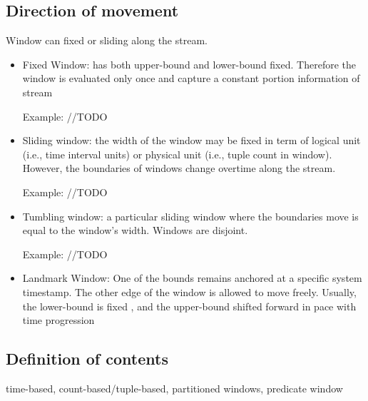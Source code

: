 \subsection{Direction of movement}
Window can fixed or sliding along the stream.
\begin{itemize}

\item Fixed Window:  has both upper-bound and lower-bound fixed. Therefore the window is evaluated only once and capture a constant portion information of stream

Example: //TODO

\item Sliding window: the width of the window may be fixed in term of logical unit (i.e., time interval units) or physical unit (i.e., tuple count in window). However, the boundaries of windows change overtime along the stream.

Example: //TODO

\item Tumbling window: a particular sliding window where the boundaries move is equal to the window's width. Windows are disjoint.

Example: //TODO

\item Landmark Window: One of the bounds remains  anchored at a specific system timestamp. The other edge of the window is allowed to move freely. Usually, the lower-bound is fixed , and the upper-bound shifted forward in pace with time progression

\end{itemize}


\subsection{Definition of contents} time-based, count-based/tuple-based, partitioned windows, predicate window

